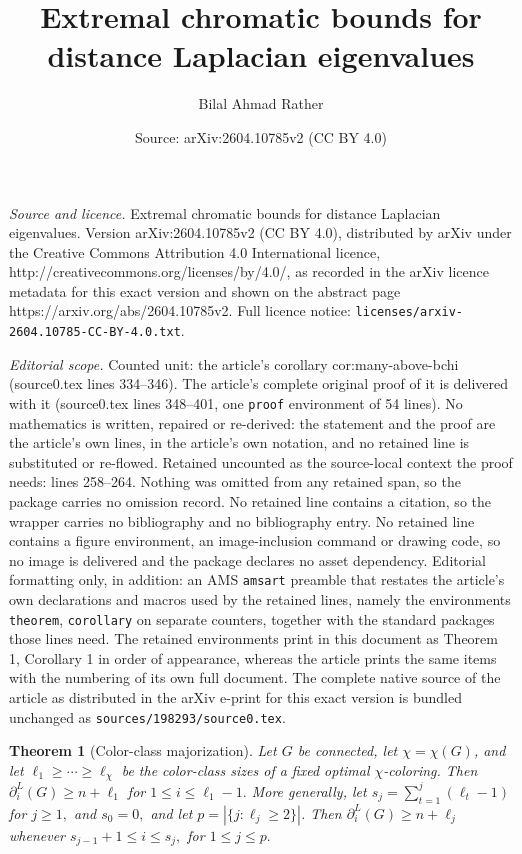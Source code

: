 \documentclass[10pt,a4paper]{amsart}
\title{Extremal chromatic bounds for distance Laplacian eigenvalues}
\author{Bilal Ahmad Rather}
\date{Source: arXiv:2604.10785v2 (CC BY 4.0)}
\newtheorem{theorem}{Theorem}
\begin{document}
\maketitle

\noindent\emph{Source and licence.} Extremal chromatic bounds for distance Laplacian eigenvalues. Version arXiv:2604.10785v2 (CC BY 4.0), distributed by arXiv under the Creative Commons Attribution 4.0 International licence, http://creativecommons.org/licenses/by/4.0/, as recorded in the arXiv licence metadata for this exact version and shown on the abstract page https://arxiv.org/abs/2604.10785v2. Full licence notice: \texttt{licenses/arxiv-2604.10785-CC-BY-4.0.txt}.\par\smallskip

\noindent\textit{Editorial scope.} Counted unit: the article's corollary cor:many-above-bchi (source0.tex lines 334--346). The article's complete original proof of it is delivered with it (source0.tex lines 348--401, one \texttt{proof} environment of 54 lines). No mathematics is written, repaired or re-derived: the statement and the proof are the article's own lines, in the article's own notation, and no retained line is substituted or re-flowed.  Retained uncounted as the source-local context the proof needs: lines 258--264.  Nothing was omitted from any retained span, so the package carries no omission record.  No retained line contains a citation, so the wrapper carries no bibliography and no bibliography entry.  No retained line contains a figure environment, an image-inclusion command or drawing code, so no image is delivered and the package declares no asset dependency.  Editorial formatting only, in addition: an AMS \texttt{amsart} preamble that restates the article's own declarations and macros used by the retained lines, namely the environments \texttt{theorem}, \texttt{corollary} on separate counters, together with the standard packages those lines need.  The retained environments print in this document as Theorem 1, Corollary 1 in order of appearance, whereas the article prints the same items with the numbering of its own full document.  The complete native source of the article as distributed in the arXiv e-print for this exact version is bundled unchanged as \texttt{sources/198293/source0.tex}.
\begin{theorem}[Color-class majorization]\label{thm:color-majorization}
Let $G$ be connected, let $\chi=\chi(G)$, and let
$\ell_1\ge\cdots\ge\ell_\chi$ be the color-class sizes of a fixed optimal $\chi$-coloring. Then
 $\partial^{L}_i(G)\ge n+\ell_1$ for $1\le i\le \ell_1-1. $
More generally, let $s_j=\sum_{t=1}^{j}(\ell_t-1)$ for $j\ge1,$ and $s_0=0,$ and let $p=|\{j:\ell_j\ge2\}|$. Then
$\partial^{L}_i(G)\ge n+\ell_j$  whenever $s_{j-1}+1\le i\le s_j,$ for  $1\le j\le p.$ 
\end{theorem}
\end{document}
